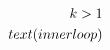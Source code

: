 \documentclass[preview]{standalone}
\begin{document}
\begin{align*}
\special{dvisvgm:raw <g id='unique000'>}k>1\\text{(inner loop)}\special{dvisvgm:raw </g>}
\end{align*}
\end{document}
